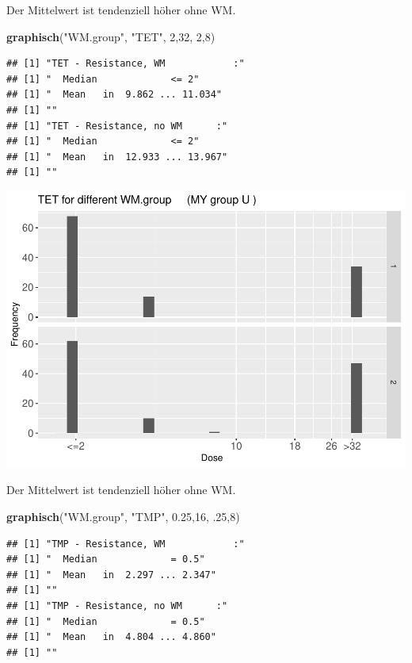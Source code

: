 \documentclass[
]{article}
\newenvironment{Shaded}{\begin{snugshade}}{\end{snugshade}}
\newcommand{\DecValTok}[1]{\textcolor[rgb]{0.00,0.00,0.81}{#1}}
\newcommand{\FloatTok}[1]{\textcolor[rgb]{0.00,0.00,0.81}{#1}}
\newcommand{\KeywordTok}[1]{\textcolor[rgb]{0.13,0.29,0.53}{\textbf{#1}}}
\newcommand{\NormalTok}[1]{#1}
\newcommand{\StringTok}[1]{\textcolor[rgb]{0.31,0.60,0.02}{#1}}
\begin{document}
Der Mittelwert ist tendenziell höher ohne WM.

\begin{Shaded}
\begin{Highlighting}[]
  \KeywordTok{graphisch}\NormalTok{(}\StringTok{"WM.group"}\NormalTok{, }\StringTok{"TET"}\NormalTok{, }\DecValTok{2}\NormalTok{,}\DecValTok{32}\NormalTok{, }\DecValTok{2}\NormalTok{,}\DecValTok{8}\NormalTok{) }
\end{Highlighting}
\end{Shaded}

\begin{verbatim}
## [1] "TET - Resistance, WM            :"
## [1] "  Median             <= 2"
## [1] "  Mean   in  9.862 ... 11.034"
## [1] ""
## [1] "TET - Resistance, no WM      :"
## [1] "  Median             <= 2"
## [1] "  Mean   in  12.933 ... 13.967"
## [1] ""
\end{verbatim}

\includegraphics{Verteilungen_files/figure-latex/unnamed-chunk-41-1.pdf}

Der Mittelwert ist tendenziell höher ohne WM.

\begin{Shaded}
\begin{Highlighting}[]
  \KeywordTok{graphisch}\NormalTok{(}\StringTok{"WM.group"}\NormalTok{, }\StringTok{"TMP"}\NormalTok{, }\FloatTok{0.25}\NormalTok{,}\DecValTok{16}\NormalTok{, }\FloatTok{.25}\NormalTok{,}\DecValTok{8}\NormalTok{) }
\end{Highlighting}
\end{Shaded}

\begin{verbatim}
## [1] "TMP - Resistance, WM            :"
## [1] "  Median             = 0.5"
## [1] "  Mean   in  2.297 ... 2.347"
## [1] ""
## [1] "TMP - Resistance, no WM      :"
## [1] "  Median             = 0.5"
## [1] "  Mean   in  4.804 ... 4.860"
## [1] ""
\end{verbatim}
\end{document}
